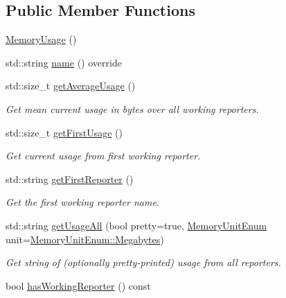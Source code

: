 \subsection*{Public Member Functions}
\begin{DoxyCompactItemize}
\item 
\hyperlink{structvt_1_1util_1_1memory_1_1_memory_usage_a5838280c7b2b24ab8ed2aff450b5e98f}{Memory\+Usage} ()
\item 
std\+::string \hyperlink{structvt_1_1util_1_1memory_1_1_memory_usage_abd58d8e05874fa3da64e15fef0b9e87f}{name} () override
\item 
std\+::size\+\_\+t \hyperlink{structvt_1_1util_1_1memory_1_1_memory_usage_a59d87ec931fe37d4300ba72b00e63d8e}{get\+Average\+Usage} ()
\begin{DoxyCompactList}\small\item\em Get mean current usage in bytes over all working reporters. \end{DoxyCompactList}\item 
std\+::size\+\_\+t \hyperlink{structvt_1_1util_1_1memory_1_1_memory_usage_ab02282aab80eb52e5f8f43095af05304}{get\+First\+Usage} ()
\begin{DoxyCompactList}\small\item\em Get current usage from first working reporter. \end{DoxyCompactList}\item 
std\+::string \hyperlink{structvt_1_1util_1_1memory_1_1_memory_usage_a5baf0fd6bf753755c4602fcb91a7c268}{get\+First\+Reporter} ()
\begin{DoxyCompactList}\small\item\em Get the first working reporter name. \end{DoxyCompactList}\item 
std\+::string \hyperlink{structvt_1_1util_1_1memory_1_1_memory_usage_aa37f5b634fb87151fc1688cdba759298}{get\+Usage\+All} (bool pretty=true, \hyperlink{namespacevt_1_1util_1_1memory_a64df3d84293b34009f78e2a1db2f9bb6}{Memory\+Unit\+Enum} unit=\hyperlink{namespacevt_1_1util_1_1memory_a64df3d84293b34009f78e2a1db2f9bb6a2276a1b157f2813f3b65d04c0b1c56f6}{Memory\+Unit\+Enum\+::\+Megabytes})
\begin{DoxyCompactList}\small\item\em Get string of (optionally pretty-\/printed) usage from all reporters. \end{DoxyCompactList}\item 
bool \hyperlink{structvt_1_1util_1_1memory_1_1_memory_usage_aee12dfad3c08673967dd1fcd6a6adfb5}{has\+Working\+Reporter} () const

\end{DoxyCompactItemize}
